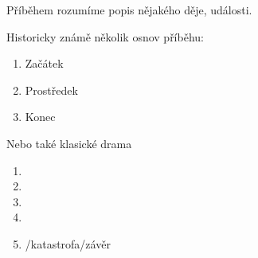\documentclass[main.tex]{subfiles}
\begin{document}
\needspace{5cm} \label{příběh} Příběhem rozumíme popis nějakého děje, události. 
 
Historicky známě několik osnov příběhu: 
 
\begin{enumerate}
\item Začátek
\item Prostředek
\item Konec
\end{enumerate}
 
Nebo také klasické drama 
\begin{enumerate}
\item {}
\item {}
\item {}
\item {}
\item {}/katastrofa/závěr
\end{enumerate}
\end{document}
